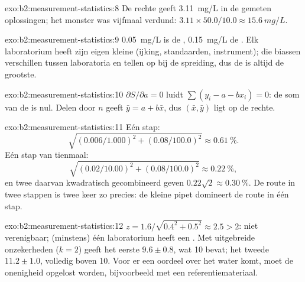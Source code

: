 \begin{solution}{exo:b2:measurement-statistics:8}
De rechte geeft \qty{3.11}{mg/L} in de gemeten oplossingen; het monster was vijfmaal verdund:
$3.11 \times 50.0/10.0 \approx \qty{15.6}{mg/L}$.
\end{solution}

\begin{solution}{exo:b2:measurement-statistics:9}
\qty{0.05}{mg/L} is de , \qty{0.15}{mg/L} de . Elk laboratorium heeft zijn
eigen kleine  (ijking, standaarden, instrument); die biassen verschillen tussen laboratoria en tellen op
bij de spreiding, dus de  is altijd de grootste.
\end{solution}

\begin{solution}{exo:b2:measurement-statistics:10}
$\partial S/\partial a = 0$ luidt $\sum(y_i - a - bx_i) = 0$: de som van de  is nul. Delen door
$n$ geeft $\bar y = a + b\bar x$, dus $(\bar x, \bar y)$ ligt op de rechte.
\end{solution}

\begin{solution}{exo:b2:measurement-statistics:11}
Eén stap:
\[\sqrt{(0.006/1.000)^2 + (0.08/100.0)^2} \approx 0.61~\%.\]
Eén stap van tienmaal:
\[\sqrt{(0.02/10.00)^2 + (0.08/100.0)^2} \approx 0.22~\%,\]
en twee daarvan kwadratisch gecombineerd geven $0.22\sqrt2 \approx 0.30~\%$. De route in twee stappen is twee keer zo precies: de kleine pipet domineert de route
in één stap.
\end{solution}

\begin{solution}{exo:b2:measurement-statistics:12}
$z = 1.6/\sqrt{0.4^2 + 0.5^2} \approx 2.5 > 2$: niet verenigbaar; (minstens) één laboratorium heeft een .
Met uitgebreide onzekerheden ($k = 2$) geeft het eerste $9.6 \pm 0.8$, wat 10 bevat; het tweede
$11.2 \pm 1.0$, volledig boven 10. Voor er een oordeel over het water komt, moet de onenigheid opgelost worden,
bijvoorbeeld met een referentiemateriaal.
\end{solution}

